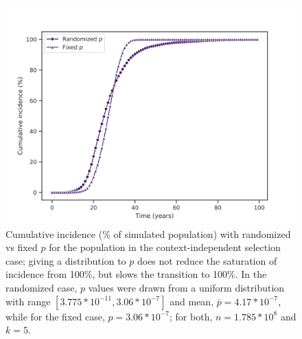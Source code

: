 \documentclass[12pt,onecolumn,twoside]{article}
\begin{document}
\begin{figure}[ht]
	\begin{minipage}[c]{0.6\textwidth}
		\includegraphics[width=\linewidth, keepaspectratio=true]{fig4.png}
	\end{minipage}
	\begin{minipage}[c]{0.4\textwidth}
		\caption{Cumulative incidence (\% of simulated population) with randomized vs fixed $p$ for the population in the context-independent selection case; giving a distribution to $p$ does not reduce the saturation of incidence from 100\%, but slows the transition to 100\%. In the randomized case, $p$ values were drawn from a uniform distribution with range $[3.775*10^{-11}, 3.06*10^{-7}]$ and mean, $\overline{p} = 4.17*10^{-7}$, while for the fixed case, $p=3.06*10^{-7}$; for both, $n=1.785*10^{8}$ and $k=5$.}
		\label{fig4}
	\end{minipage} 
\end{figure}
\end{document}
